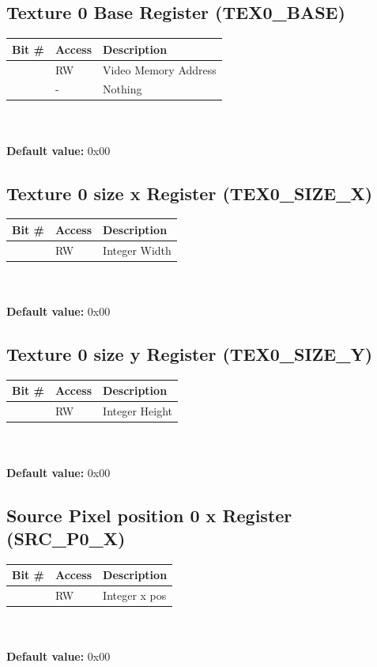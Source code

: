 \documentclass[10pt,a4paper]{article}
\begin{document}
\subsection{Texture 0 Base Register (TEX0\_BASE)}
\begin{tabular}{|l|l|l|}
\hline \textbf{Bit \#} & \textbf{Access} & \textbf{Description} \\ 
\hline
\hline [31:2] & RW & Video Memory Address \\
\hline [1:0] & - & Nothing \\
\hline 
\end{tabular}
\\\\
\textbf{Default value:} 0x00

\subsection{Texture 0 size x Register (TEX0\_SIZE\_X)}
\begin{tabular}{|l|l|l|}
\hline \textbf{Bit \#} & \textbf{Access} & \textbf{Description} \\ 
\hline
\hline [31:0] & RW & Integer Width \\
\hline 
\end{tabular}
\\\\
\textbf{Default value:} 0x00

\subsection{Texture 0 size y Register (TEX0\_SIZE\_Y)}
\begin{tabular}{|l|l|l|}
\hline \textbf{Bit \#} & \textbf{Access} & \textbf{Description} \\ 
\hline
\hline [31:0] & RW & Integer Height \\
\hline 
\end{tabular}
\\\\
\textbf{Default value:} 0x00

\subsection{Source Pixel position 0 x Register (SRC\_P0\_X)}
\begin{tabular}{|l|l|l|}
\hline \textbf{Bit \#} & \textbf{Access} & \textbf{Description} \\ 
\hline
\hline [31:0] & RW & Integer x pos \\
\hline 
\end{tabular}
\\\\
\textbf{Default value:} 0x00
\end{document}
